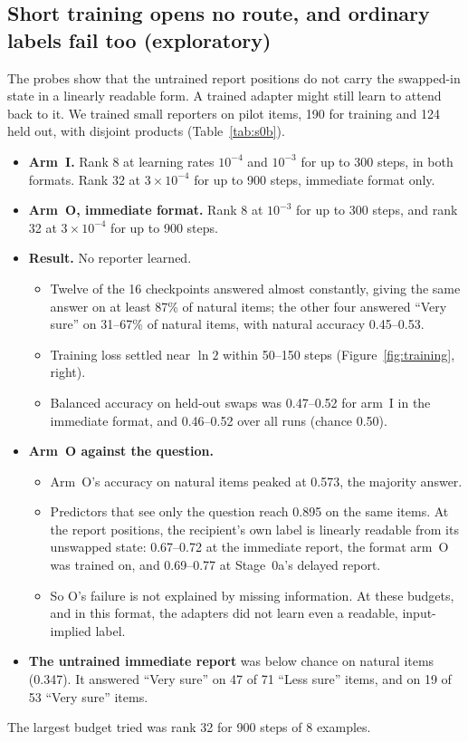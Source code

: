 \documentclass[11pt]{article}
\begin{document}
\subsection{Short training opens no route, and ordinary labels fail too (exploratory)}

The probes show that the untrained report positions do not carry the swapped-in state in a linearly readable form. A trained adapter might still learn to attend back to it. We trained small reporters on pilot items, 190 for training and 124 held out, with disjoint products (Table~\ref{tab:s0b}).
\begin{itemize}
\item \textbf{Arm~I.} Rank 8 at learning rates $10^{-4}$ and $10^{-3}$ for up to 300 steps, in both formats. Rank 32 at $3 \times 10^{-4}$ for up to 900 steps, immediate format only.
\item \textbf{Arm~O, immediate format.} Rank 8 at $10^{-3}$ for up to 300 steps, and rank 32 at $3 \times 10^{-4}$ for up to 900 steps.
\item \textbf{Result.} No reporter learned.
  \begin{itemize}
  \item Twelve of the 16 checkpoints answered almost constantly, giving the same answer on at least 87\% of natural items; the other four answered ``Very sure'' on 31--67\% of natural items, with natural accuracy 0.45--0.53.
  \item Training loss settled near $\ln 2$ within 50--150 steps (Figure~\ref{fig:training}, right).
  \item Balanced accuracy on held-out swaps was 0.47--0.52 for arm~I in the immediate format, and 0.46--0.52 over all runs (chance 0.50).
  \end{itemize}
\item \textbf{Arm~O against the question.}
  \begin{itemize}
  \item Arm~O's accuracy on natural items peaked at 0.573, the majority answer.
  \item Predictors that see only the question reach 0.895 on the same items. At the report positions, the recipient's own label is linearly readable from its unswapped state: 0.67--0.72 at the immediate report, the format arm~O was trained on, and 0.69--0.77 at Stage~0a's delayed report.
  \item So O's failure is not explained by missing information. At these budgets, and in this format, the adapters did not learn even a readable, input-implied label.
  \end{itemize}
\item \textbf{The untrained immediate report} was below chance on natural items (0.347). It answered ``Very sure'' on 47 of 71 ``Less sure'' items, and on 19 of 53 ``Very sure'' items.
\end{itemize}
The largest budget tried was rank 32 for 900 steps of 8 examples.
\end{document}
